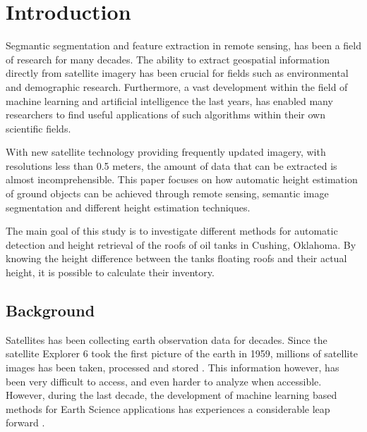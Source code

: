 \chapter{Introduction}
Segmantic segmentation and feature extraction in remote sensing, has been a field of research for many decades. The ability to extract geospatial information directly from satellite imagery has been crucial for fields such as environmental and demographic research. Furthermore, a vast development within the field of machine learning and artificial intelligence the last years, has enabled many researchers to find useful applications of such algorithms within their own scientific fields.

With new satellite technology providing frequently updated imagery, with resolutions less than 0.5 meters, the amount of data that can be extracted is almost incomprehensible. This paper focuses on how automatic height estimation of ground objects can be achieved through remote sensing, semantic image segmentation and different height estimation techniques.

The main goal of this study is to investigate different methods for automatic detection and height retrieval of the roofs of oil tanks in Cushing, Oklahoma. By knowing the height difference between the tanks floating roofs and their actual height, it is possible to calculate their inventory.

\section{Background}

Satellites has been collecting earth observation data for decades. Since the satellite Explorer 6 took the first picture of the earth in 1959, millions of satellite images has been taken, processed and stored \cite{Esa2009a}. This information however, has been very difficult to access, and even harder to analyze when accessible. However, during the last decade, the development of machine learning based methods for Earth Science applications has experiences a considerable leap forward \cite{Lary2010}.

